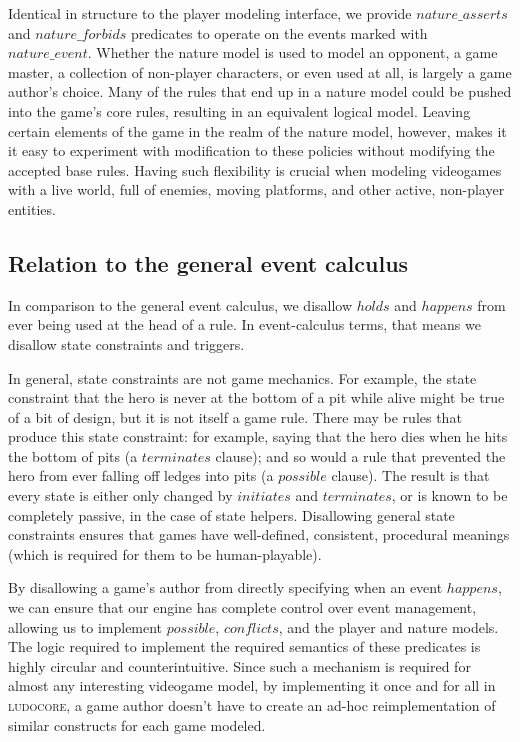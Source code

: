 \documentclass[letterpaper]{article}
\newcommand{\ludocore}{\textsc{ludocore}}
\newcommand{\logical}[1]{$#1$}
\begin{document}
Identical in structure to the player modeling interface, we provide
\logical{nature\_asserts} and \logical{nature\_forbids} predicates to operate on
the events marked with \logical{nature\_event}. Whether the nature model is used
to model an opponent, a game master, a collection of non-player characters, or
even used at all, is largely a game author's choice. Many of the rules
that end up in a nature model could be pushed into the game's core rules,
resulting in an equivalent logical model. Leaving certain elements of the game
in the realm of the nature model, however, makes it it easy to experiment with
modification to these policies without modifying the accepted base rules. Having
such flexibility is crucial when modeling videogames with a live world, full
of enemies, moving platforms, and other active, non-player entities.

\subsection{Relation to the general event calculus}

In comparison to the general event calculus, we disallow \logical{holds} and
\logical{happens} from ever being used at the head of a rule. In event-calculus
terms, that means we disallow state constraints and triggers.

In general, state constraints are not game mechanics. For example, the state
constraint that the hero is never at the bottom of a pit while alive might be
true of a bit of design, but it is not itself a game rule. There may be rules that
produce this state constraint: for example, saying that the hero dies when he
hits the bottom of pits (a \logical{terminates} clause); and so would a rule
that prevented the hero from ever falling off ledges into pits (a
\logical{possible} clause). The result is that every state is either
only changed by \logical{initiates} and \logical{terminates}, or is known
to be completely passive, in the case of state helpers. Disallowing general
state constraints ensures that games have well-defined, consistent, procedural
meanings (which is required for them to be human-playable).

By disallowing a game's author from directly specifying when an event
\logical{happens}, we can ensure that our engine has complete control over
event management, allowing us to implement \logical{possible},
\logical{conflicts}, and the player and nature models. The logic required to
implement the required semantics of these predicates is highly circular and
counterintuitive. Since such a mechanism is required for almost any interesting
videogame model, by implementing it once and for all in \ludocore, a game
author doesn't have to create an ad-hoc reimplementation of similar constructs
for each game modeled.
\end{document}
